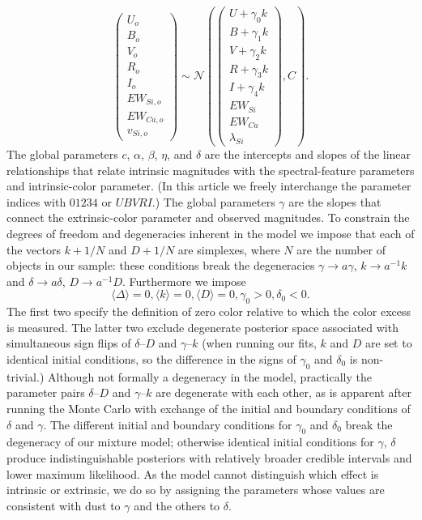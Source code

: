 \documentclass{aastex}   	%
\begin{document}
\begin{equation}
\begin{pmatrix}
U_o\\B_o\\ V_o\\R_o\\I_o\\EW_{Si, o}\\ EW_{Ca, o} \\ v_{Si, o}
\end{pmatrix}
\sim \mathcal{N}
\left(
\begin{pmatrix}
U +\gamma_0 k \\B +\gamma_1 k \\V+\gamma_2 k\\R+\gamma_3 k\\I+\gamma_4 k\\
EW_{Si}\\ EW_{Ca} \\ \lambda_{Si}
\end{pmatrix}
,C
\right).
\label{dust:eqn}
\end{equation}
The global parameters $c$, $\alpha$, $\beta$, $\eta$, and $\delta$  are the intercepts and slopes of the linear relationships that
relate intrinsic magnitudes with the spectral-feature parameters and intrinsic-color parameter.
(In this article we freely interchange the parameter indices with  $01234$ or $UBVRI$.)
The global parameters $\gamma$ are the slopes that connect the extrinsic-color
parameter and observed magnitudes.  To constrain the degrees of freedom and degeneracies inherent in the model we impose that
\color{red}
each of the vectors $k+1/N$ and $D+1/N$ are simplexes, where $N$ are the number of objects in our sample: these
conditions break the 
degeneracies  $\gamma \rightarrow a\gamma$, $k \rightarrow a^{-1}k$ and $\delta \rightarrow a\delta$, $D \rightarrow a^{-1}D$.
Furthermore we impose
\color{black} 
\begin{equation}
\langle \Delta \rangle=0, \langle k \rangle=0, \langle D \rangle=0, \gamma_0 > 0, \delta_0 < 0.
\end{equation}
The first two specify the definition of zero color relative to which the color excess is measured.    The latter two exclude degenerate posterior space
associated
with  simultaneous sign flips of
$\delta$--$D$ and $\gamma$--$k$
\color{red}
(when running our fits, $k$ and $D$ are set to
identical initial conditions, so the difference in the signs of $\gamma_0$ and $\delta_0$ is non-trivial.)
Although not formally a degeneracy in the model, practically the parameter pairs  $\delta$--$D$ and $\gamma$--$k$ are degenerate with
each other, as is apparent after 
running the Monte Carlo with exchange of the initial  and boundary conditions of $\delta$ and $\gamma$.
The different initial and boundary conditions for $\gamma_0$ and $\delta_0$ break the degeneracy of our mixture model;
otherwise identical initial conditions for $\gamma$, $\delta$ produce indistinguishable posteriors
with relatively broader credible intervals and lower maximum likelihood.
\color{black}
As the model cannot distinguish which effect is intrinsic or extrinsic, we do so
by assigning the parameters whose values are consistent with dust to $\gamma$ and the others to $\delta$.
\end{document}
